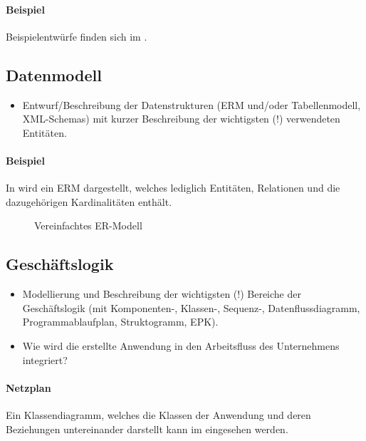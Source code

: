 \paragraph{Beispiel}
Beispielentwürfe finden sich im .


\subsection{Datenmodell}
\label{sec:Datenmodell}

\begin{itemize}
	\item Entwurf/Beschreibung der Datenstrukturen (\zB \acs{ERM} und/oder Tabellenmodell, \acs{XML}-Schemas) mit kurzer Beschreibung der wichtigsten (!) verwendeten Entitäten.
\end{itemize}

\paragraph{Beispiel}
In  wird ein \ac{ERM} dargestellt, welches lediglich Entitäten, Relationen und die dazugehörigen Kardinalitäten enthält. 

\begin{figure}[htb]
\centering
{}
\caption{Vereinfachtes ER-Modell}
\label{fig:ER}
\end{figure} 


\subsection{Geschäftslogik}
\label{sec:Geschaeftslogik}

\begin{itemize}
	\item Modellierung und Beschreibung der wichtigsten (!) Bereiche der Geschäftslogik (\zB mit Kom\-po\-nen\-ten-, Klassen-, Sequenz-, Datenflussdiagramm, Programmablaufplan, Struktogramm, \ac{EPK}).
	\item Wie wird die erstellte Anwendung in den Arbeitsfluss des Unternehmens integriert?
\end{itemize}

\paragraph{Netzplan}
Ein Klassendiagramm, welches die Klassen der Anwendung und deren Beziehungen untereinander darstellt kann im  eingesehen werden.

